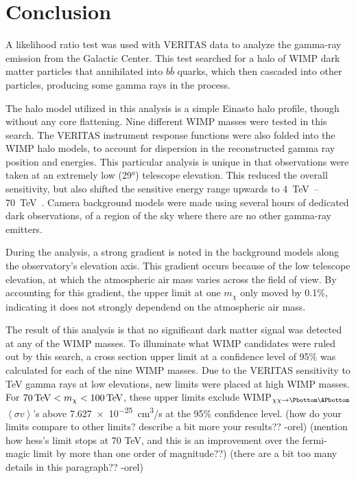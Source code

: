 \cleartooddpage[\thispagestyle{empty}]
\chapter{Conclusion}


A likelihood ratio test was used with VERITAS data to analyze the gamma-ray emission from the Galactic Center.
This test searched for a halo of WIMP dark matter particles that annihilated into $b\bar{b}$ quarks, which then cascaded into other particles, producing some gamma rays in the process.

The halo model utilized in this analysis is a simple Einasto halo profile, though without any core flattening.
Nine different WIMP masses were tested in this search.
The VERITAS instrument response functions were also folded into the WIMP halo models, to account for dispersion in the reconstructed gamma ray position and energies.
This particular analysis is unique in that observations were taken at an extremely low (\nicetilde{}\ang{29}) telescope elevation.
This reduced the overall sensitivity, but also shifted the sensitive energy range upwards to \SIrange{4}{70}{\TeV{}}.
Camera background models were made using several hours of dedicated dark observations, of a region of the sky where there are no other gamma-ray emitters.

During the analysis, a strong gradient is noted in the background models along the observatory's elevation axis.
This gradient occurs because of the low telescope elevation, at which the atmospheric air mass varies across the field of view.
By accounting for this gradient, the upper limit at one $m_{\chi}$ only moved by 0.1\%, indicating it does not strongly dependend on the atmospheric air mass.

The result of this analysis is that no significant dark matter signal was detected at any of the WIMP masses.
To illuminate what WIMP candidates were ruled out by this search, a cross section upper limit at a confidence level of 95\% was calculated for each of the nine WIMP masses.
Due to the VERITAS sensitivity to TeV gamma rays at low elevations, new limits were placed at high WIMP masses.
For $70\,\TeV<m_{\chi}<100\,\TeV$, these upper limits exclude WIMP$_{\chi\chi\rightarrow\Pbottom\APbottom}$ $\left \langle \sigma v \right \rangle$'s above \SI{7.627e-25}{cm^3/s} at the 95\% confidence level.
{\color{red}(how do your limits compare to other limits? describe a bit more your results?? -orel)}
{\color{red}(mention how hess's limit stops at 70 TeV, and this is an improvement over the fermi-magic limit by more than one order of magnitude??)}
{\color{red}(there are a bit too many details in this paragraph?? -orel)}

